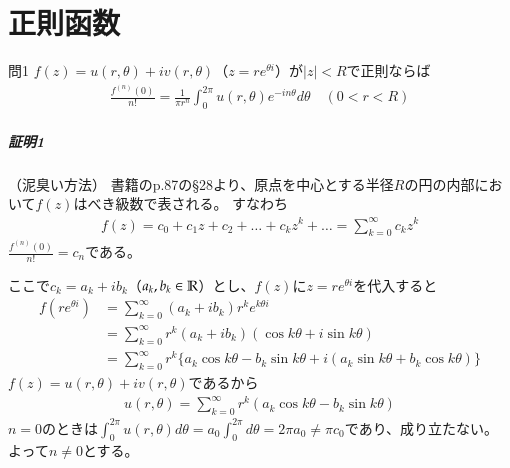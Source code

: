 \chapter{正則函数}%

\begin{mysimplebox}{問1}
   $f(z)=u(r,\theta)+iv(r,\theta)$（$z=re^{\theta i}$）が$|z|<R$で正則ならば
   \begin{align*}
    \frac{f^{(n)}(0)}{n!}
    =\frac{1}{\pi r^n}\int_{0}^{2\pi}u(r,\theta)e^{-in\theta}d\theta\quad(0<r<R)
   \end{align*}
\end{mysimplebox}
\paragraph{証明1}（泥臭い方法）
書籍のp.87の§28より、原点を中心とする半径$R$の円の内部において$f(z)$はべき級数で表される。
すなわち
\begin{align*}
    f(z)=c_0+c_1z+c_2+\dots+c_kz^k+\dots
    =\sum_{k=0}^{\infty}c_kz^k
\end{align*}
$\frac{f^{(n)}(0)}{n!}=c_n$である。

ここで$c_k=a_k+ib_k$（$a_k,b_k\in\mathbb{R}$）とし、$f(z)$に$z=re^{\theta i}$を代入すると
\begin{align*}
    f(re^{\theta i})
    &=\sum_{k=0}^{\infty}(a_k+ib_k)r^ke^{k\theta i}\\
    &=\sum_{k=0}^{\infty}r^k(a_k+ib_k)(\cos k\theta+i\sin k\theta)\\
    &=\sum_{k=0}^{\infty}r^k\{a_k\cos k\theta-b_k\sin k\theta+i(a_k\sin k\theta+b_k\cos k\theta)\}
\end{align*}
$f(z)=u(r,\theta)+iv(r,\theta)$であるから
\begin{align*}
    u(r,\theta)
    =\sum_{k=0}^{\infty}r^k(a_k\cos k\theta-b_k\sin k\theta)
\end{align*}
$n=0$のときは$\int_{0}^{2\pi}u(r,\theta)d\theta=a_0\int_{0}^{2\pi}d\theta=2\pi a_0\neq \pi c_0$であり、成り立たない。よって$n\neq0$とする。

